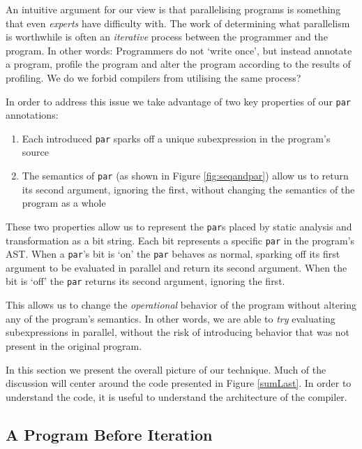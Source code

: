 An intuitive argument for our view is that parallelising programs is something
that even \emph{experts} have difficulty with. The work of determining what
parallelism is worthwhile is often an \emph{iterative} process between the
programmer and the program. In other words: Programmers do not `write once',
but instead annotate a program, profile the program and alter the program
according to the results of profiling. We do we forbid compilers from utilising
the same process?



In order to address this issue we take advantage of
two key properties of our \verb-par- annotations:

\begin{enumerate}
    \item Each introduced \verb-par- sparks off a unique subexpression
            in the program's source
    \item The semantics of \verb-par- (as shown in Figure \ref{fig:seqandpar})
            allow us to return its second argument, ignoring the first,
            without changing the semantics of the program as a whole
\end{enumerate}

These two properties allow us to represent the \verb-par-s placed by static
analysis and transformation as a bit string. Each bit represents a specific
\verb-par- in the program's AST. When a \verb-par-'s bit is `on' the \verb-par-
behaves as normal, sparking off its first argument to be evaluated in parallel
and return its second argument. When the bit is `off' the \verb-par- returns
its second argument, ignoring the first.

This allows us to change the \emph{operational} behavior of the program without
altering any of the program's semantics. In other words, we are able to \emph{try}
evaluating subexpressions in parallel, without the risk of introducing behavior
that was not present in the original program.


In this section we present the overall picture of our technique. Much of the
discussion will center around the code presented in Figure \ref{sumLast}. In
order to understand the code, it is useful to understand the architecture of the
compiler.

\subsection{A Program Before Iteration}

